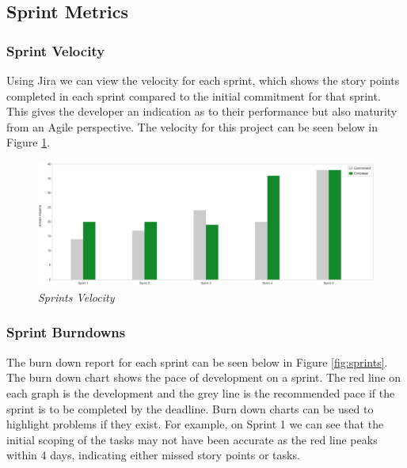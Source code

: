 \subsection{Sprint Metrics}

\subsubsection{Sprint Velocity}
Using Jira we can view the velocity for each sprint, which shows the story points completed in each sprint compared to the initial commitment for that sprint. This gives the developer an indication as to their performance but also maturity from an Agile perspective. The velocity for this project can be seen below in Figure \ref{fig:velocity}.

\begin{figure}[!ht]
\centering
\includegraphics*[width=\textwidth]{images/velocity}
\caption{\em Sprints Velocity}
\label{fig:velocity}
\end{figure}

\subsubsection{Sprint Burndowns}

The burn down report for each sprint can be seen below in Figure \ref{fig:sprints}. The burn down chart shows the pace of development on a sprint. The red line on each graph is the development and the grey line is the recommended pace if the sprint is to be completed by the deadline. Burn down charts can be used to highlight problems if they exist. For example, on Sprint 1 we can see that the initial scoping of the tasks may not have been accurate as the red line peaks within 4 days, indicating either missed story points or tasks.

